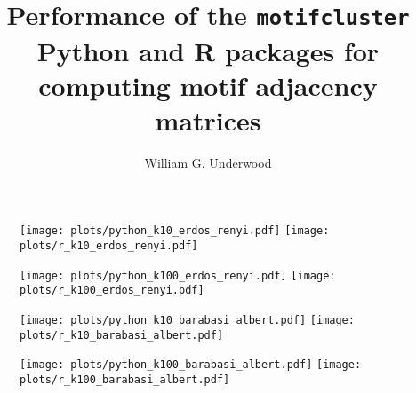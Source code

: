 \documentclass{article}
\author{William G. Underwood}
\title{Performance of the \texttt{motifcluster}
  Python and R packages
  for computing motif adjacency matrices}
\begin{document}
\maketitle


\begin{figure}[H]
  \centering
  \texttt{[image: plots/python\_k10\_erdos\_renyi.pdf]}
  \texttt{[image: plots/r\_k10\_erdos\_renyi.pdf]}
\end{figure}

\pagebreak

\begin{figure}[H]
  \centering
  \texttt{[image: plots/python\_k100\_erdos\_renyi.pdf]}
  \texttt{[image: plots/r\_k100\_erdos\_renyi.pdf]}
\end{figure}

\pagebreak

\begin{figure}[H]
  \centering
  \texttt{[image: plots/python\_k10\_barabasi\_albert.pdf]}
  \texttt{[image: plots/r\_k10\_barabasi\_albert.pdf]}
\end{figure}

\pagebreak

\begin{figure}[H]
  \centering
  \texttt{[image: plots/python\_k100\_barabasi\_albert.pdf]}
  \texttt{[image: plots/r\_k100\_barabasi\_albert.pdf]}
\end{figure}

\pagebreak
\end{document}

